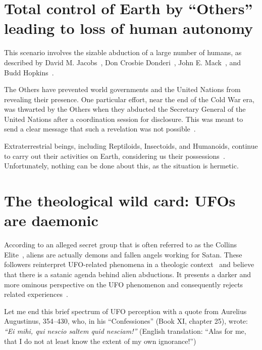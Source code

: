 \section{Total control of Earth by ``Others'' leading to loss of human autonomy}
\label{2023-UFO-part-Speculation-executive-summary-tl} %

This scenario involves the sizable abduction of a large number of humans, as described by David M. Jacobs~\cite{Jacobs1993Apr,Jacobs1999Mar,Jacobs2015Sep}, Don Crosbie Donderi~\cite{HJW1992,Donderi2013Mar,Donderi2013Jun},
John E. Mack~\cite{Mack-NYT1994Mar,Mack1994Apr,Mack1999PC}, and Budd Hopkins~\cite{Hopkins1981}.

The Others have prevented world governments and the United Nations from revealing their presence. One particular effort, near the end of the Cold War era, was thwarted by the Others when they abducted the Secretary General of the United Nations after a coordination session for disclosure. This was meant to send a clear message that such a revelation was not possible~\cite{hopkins-bbi}.

Extraterrestrial beings, including Reptiloids, Insectoids, and Humanoids, continue to carry out their activities on Earth, considering us their possessions~\cite{FortBotD}. Unfortunately, nothing can be done about this, as the situation is hermetic.



\section{The theological wild card: UFOs are daemonic}

According to an alleged secret group that is often referred to as the Collins Elite~\cite{Redfern2010Aug,Heiser2010Nov},
aliens are actually demons and fallen angels working for Satan.
These followers reinterpret UFO-related phenomena in a theologic context~\cite{Kripal2011Nov,Pasulka2023Feb}
and believe that there is a satanic agenda behind alien abductions.
It presents a darker and more ominous perspective on the UFO phenomenon and consequently rejects related experiences~\cite[p.~219]{Pasulka2019Feb}.

Let me end this brief spectrum of UFO perception with a quote from Aurelius Augustinus, 354--430, who, in his ``Confessiones'' (Book XI, chapter 25), wrote:
{\em ``Ei mihi, qui nescio saltem quid nesciam!''}
(English translation: ``Alas for me, that I do not at least know the extent of my own ignorance!'')


